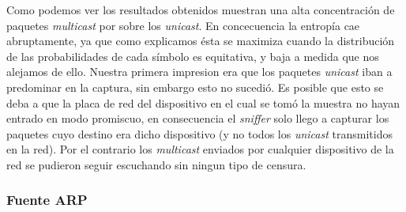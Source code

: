  Como podemos ver los resultados obtenidos muestran una alta concentración de paquetes \textit{multicast} por sobre los \textit{unicast}. En concecuencia la entropía cae abruptamente, ya que como explicamos ésta se maximiza cuando la distribución de las probabilidades de cada símbolo es equitativa, y baja a medida que nos alejamos de ello. Nuestra primera impresion era que los paquetes \textit{unicast} iban a predominar en la captura, sin embargo esto no sucedió. Es posible que esto se deba a que la placa de red del dispositivo en el cual se tomó la muestra no hayan entrado en modo promiscuo, en consecuencia el \textit{sniffer} solo llego a capturar los paquetes cuyo destino era dicho dispositivo (y no todos los \textit{unicast} transmitidos en la red). Por el contrario los \textit{multicast} enviados por cualquier dispositivo de la red se pudieron seguir escuchando sin ningun tipo de censura.
 
\subsubsection{Fuente ARP}


